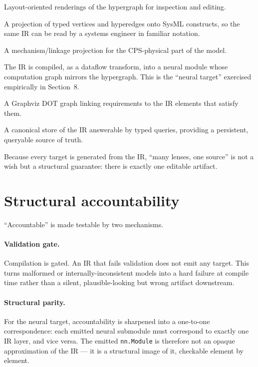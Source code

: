 \documentclass[11pt]{article}
\begin{document}
\begin{description}[leftmargin=1.4em,style=nextline]
  \item[2D / 3D graph views] Layout-oriented renderings of the hypergraph for
    inspection and editing.
  \item[SysML lens] A projection of typed vertices and hyperedges onto SysML
    \cite{omgsysml} constructs, so the same IR can be read by a systems engineer
    in familiar notation.
  \item[Kinematic view] A mechanism/linkage projection for the CPS-physical part
    of the model.
  \item[PyTorch \texttt{nn.Module}] The IR is compiled, as a dataflow transform,
    into a neural module whose computation graph mirrors the hypergraph. This is
    the ``neural target'' exercised empirically in Section~8.
  \item[DOT requirements traceability] A Graphviz DOT graph linking requirements
    to the IR elements that satisfy them.
  \item[HIVE canonical store] A canonical store of the IR answerable by typed
    queries, providing a persistent, queryable source of truth.
\end{description}

Because every target is generated from the IR, ``many lenses, one source''
is not a wish but a structural guarantee: there is exactly one editable artifact.

\section{Structural accountability}
\label{sec:accountability}
``Accountable'' is made testable by two mechanisms.

\paragraph{Validation gate.}
Compilation is gated. An IR that fails validation does not emit any target. This
turns malformed or internally-inconsistent models into a hard failure at compile
time rather than a silent, plausible-looking but wrong artifact downstream.

\paragraph{Structural parity.}
For the neural target, accountability is sharpened into a one-to-one
correspondence: each emitted neural submodule must correspond to exactly one IR
layer, and vice versa. The emitted \texttt{nn.Module} is therefore not an opaque
approximation of the IR --- it is a structural image of it, checkable element by
element.
\end{document}

